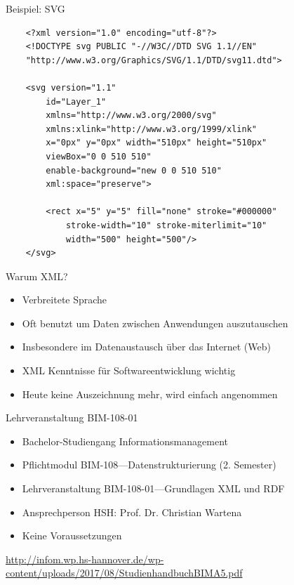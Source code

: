 \documentclass{beamer}
\begin{document}
\begin{frame}[fragile]{Beispiel: SVG}
	\small
	\begin{lstlisting}
	<?xml version="1.0" encoding="utf-8"?>
	<!DOCTYPE svg PUBLIC "-//W3C//DTD SVG 1.1//EN"
	"http://www.w3.org/Graphics/SVG/1.1/DTD/svg11.dtd">

	<svg version="1.1" 
		id="Layer_1" 
		xmlns="http://www.w3.org/2000/svg" 
		xmlns:xlink="http://www.w3.org/1999/xlink" 
		x="0px" y="0px" width="510px" height="510px" 
		viewBox="0 0 510 510" 
		enable-background="new 0 0 510 510" 
		xml:space="preserve">

		<rect x="5" y="5" fill="none" stroke="#000000" 
			stroke-width="10" stroke-miterlimit="10" 
			width="500" height="500"/>
	</svg>
	\end{lstlisting}	
\end{frame}

\begin{frame}{Warum XML?}
	
	\begin{itemize}
		\item Verbreitete Sprache
		\item Oft benutzt um Daten zwischen Anwendungen auszutauschen
		\item Insbesondere im Datenaustausch über das Internet (Web)
		\item XML Kenntnisse für Softwareentwicklung wichtig
		\item Heute keine Auszeichnung mehr, wird einfach angenommen
	\end{itemize}
	
\end{frame}

\begin{frame}{Lehrveranstaltung BIM-108-01}
	
	\begin{itemize}
		\item Bachelor-Studiengang Informationsmanagement
		\item Pflichtmodul BIM-108---Datenstrukturierung (2. Semester)
		\item Lehrveranstaltung BIM-108-01---Grundlagen XML und RDF
		\item Ansprechperson HSH: Prof. Dr. Christian Wartena
		\item Keine Voraussetzungen 
	\end{itemize}
	
	\vspace{0.5cm}
	
	\url{http://infom.wp.hs-hannover.de/wp-content/uploads/2017/08/StudienhandbuchBIMA5.pdf}
		
\end{frame}
\end{document}
